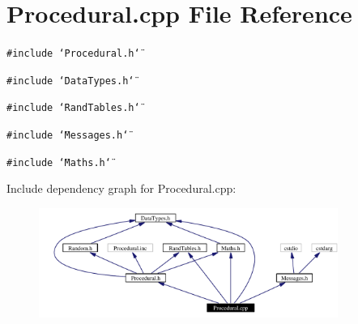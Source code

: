 \section{Procedural.cpp File Reference}
\label{Procedural_8cpp}
{\tt \#include \char`\"{}Procedural.h\char`\"{}}\par
{\tt \#include \char`\"{}Data\-Types.h\char`\"{}}\par
{\tt \#include \char`\"{}Rand\-Tables.h\char`\"{}}\par
{\tt \#include \char`\"{}Messages.h\char`\"{}}\par
{\tt \#include \char`\"{}Maths.h\char`\"{}}\par


Include dependency graph for Procedural.cpp:\begin{figure}[H]
\begin{center}
\leavevmode
\includegraphics[width=277pt]{Procedural_8cpp__incl}
\end{center}
\end{figure}
